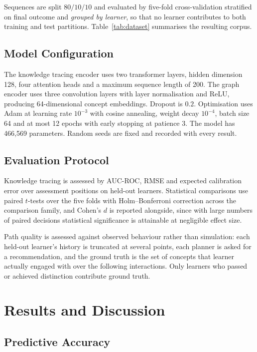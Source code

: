 \documentclass[conference]{IEEEtran}
\begin{document}
Sequences are split $80/10/10$ and evaluated by five-fold cross-validation stratified on
final outcome and \emph{grouped by learner}, so that no learner contributes to both
training and test partitions. Table~\ref{tab:dataset} summarises the resulting corpus.

\subsection{Model Configuration}

The knowledge tracing encoder uses two transformer layers, hidden dimension 128, four
attention heads and a maximum sequence length of 200. The graph encoder uses three
convolution layers with layer normalisation and ReLU, producing 64-dimensional concept
embeddings. Dropout is $0.2$. Optimisation uses Adam at learning rate $10^{-3}$ with
cosine annealing, weight decay $10^{-4}$, batch size 64 and at most 12 epochs with early
stopping at patience 3. The model has 466{,}569 parameters. Random seeds are fixed and
recorded with every result.

\subsection{Evaluation Protocol}

Knowledge tracing is assessed by AUC-ROC, RMSE and expected calibration error over
assessment positions on held-out learners. Statistical comparisons use paired $t$-tests
over the five folds with Holm--Bonferroni correction across the comparison family, and
Cohen's $d$ is reported alongside, since with large numbers of paired decisions
statistical significance is attainable at negligible effect size.

Path quality is assessed against observed behaviour rather than simulation: each
held-out learner's history is truncated at several points, each planner is asked for a
recommendation, and the ground truth is the set of concepts that learner actually
engaged with over the following interactions. Only learners who passed or achieved
distinction contribute ground truth.

\section{Results and Discussion}
\label{sec:results}

\subsection{Predictive Accuracy}
\end{document}
